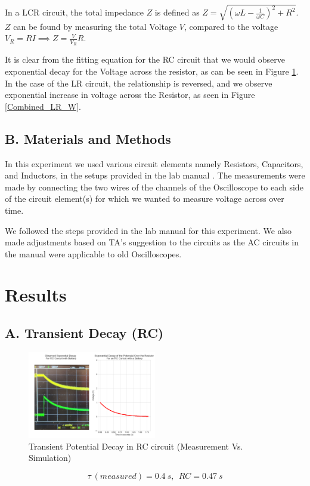 \documentclass[a4paper,12pt]{article}
\begin{document}
In a LCR circuit, the total impedance $Z$ is defined as $Z = \sqrt{(\omega L - \frac{1}{\omega C})^2 + R^2}$. $Z$ can be found by measuring 
the total Voltage $V$, compared to the voltage $V_R = RI \implies Z = \frac{V}{V_R}R$.

It is clear from the fitting equation for the RC circuit that we would observe exponential decay for the Voltage across the resistor, as can be seen in Figure \ref{Combined_RC_B}. In the case of the LR circuit, the relationship is reversed, and we observe exponential increase 
in voltage across the Resistor, as seen in Figure \ref{Combined_LR_W}.

\subsection*{B. Materials and Methods}

In this experiment we used various circuit elements namely Resistors, Capacitors, and Inductors, in the setups provided
in the lab manual \cite{lab-manual-ex7}. The measurements were made by connecting the two wires of the channels of the Oscilloscope to each side of the circuit element(s) for which we wanted to measure voltage across over time.

We followed the steps provided in the lab manual \cite{lab-manual-ex7} for this 
experiment. We also made adjustments based on TA's suggestion to the circuits as the 
AC circuits in the manual were applicable to old Oscilloscopes.

\section{Results}
\subsection*{A. Transient Decay (RC)}

\begin{figure}[H]
  \centerline{\includegraphics[width=0.5\textwidth]{../Simulated Curves/RC_B-mod.png}}
  \caption{Transient Potential Decay in RC circuit (Measurement Vs. Simulation)}
  \label{Combined_RC_B}
\end{figure}
$$\tau\ (measured) = 0.4\ s, \ \ RC = 0.47\ s$$
\end{document}
